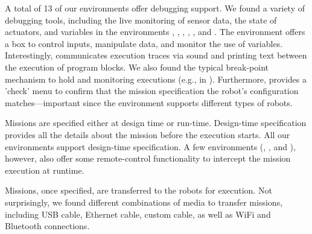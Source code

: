  A total of 13 of our environments offer debugging support. We found a variety of debugging tools, including the live monitoring of sensor data, the state of actuators, and variables in the environments \picaxe, \aseba, \trik, \flyaq, \easyc, and \edison. The environment \edison offers a box to control inputs, manipulate data, and monitor the use of variables. %
Interestingly, \makecode communicates execution traces via sound and printing text between the execution of program blocks. %
We also found the typical break-point mechanism to hold and monitoring executions (e.g., in \robotmesh).
Furthermore, \openroberta provides a 'check' menu to confirm that the mission specification the robot's configuration matches---important since the environment supports different types of robots. 

 Missions are specified either at design time or run-time. Design-time specification provides all the details about the mission before the execution starts.
All our environments support design-time specification. A few environments (\turtlebot, \sphero, and \choregraphe), however, also offer some remote-control functionality to intercept the mission execution at runtime. %

 Missions, once specified, are transferred to the robots for execution. Not surprisingly, we found different combinations of media to transfer missions, including USB cable, Ethernet cable, custom cable, as well as WiFi and Bluetooth connections.


